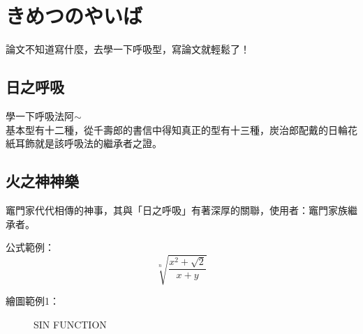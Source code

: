 \chapter{きめつのやいば}\label{structure}

論文不知道寫什麼，去學一下呼吸型，寫論文就輕鬆了！

\section{日之呼吸}
學一下呼吸法阿$\sim$ \\
基本型有十二種，從千壽郎的書信中得知真正的型有十三種，炭治郎配戴的日輪花紙耳飾就是該呼吸法的繼承者之證。

\section{火之神神樂}
竈門家代代相傳的神事，其與「日之呼吸」有著深厚的關聯，使用者：竈門家族繼承者。

公式範例：
\begin{equation}
   \sqrt[n]{\frac{x^2+\sqrt 2}{x+y}}
\end{equation}

繪圖範例1：
\begin{figure}[H]

   \centering
      \pgfplotsset{width=6cm}          %
   \caption{SIN FUNCTION}
   \label{fig:SIN FUNCTION}

\end{figure}
